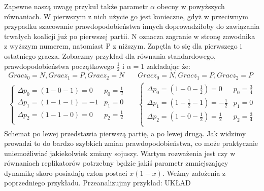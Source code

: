 Zapewne naszą uwagę przykuł także parametr $\alpha$ obecny w powyższych równaniach. W pierwszym z nich użycie go jest konieczne, gdyż w przeciwnym przypadku szacowanie prawdopodobieństwa innych doprowadziłoby do zawiązania trwałych koalicji już po pierwszej partii. N oznacza zagranie w stronę zawodnika z wyższym numerem, natomiast P z niższym. Zapętla to się dla pierwszego i ostatniego gracza. Zobaczmy przykład dla równania standardowego, prawdopodobieństwa początkowego $\frac{1}{2}$ i $\alpha = 1$ zakładając że:
\begin{align*}
Gracz_0 = N, Gracz_1 = P, Gracz_2 = N && Gracz_0 = N, Gracz_1 = P, Gracz_2 = P\\
\left\{
\begin{array}{ll}
\Delta p_0 = (1 - 0 - 1) =  0 & p_0=\frac{1}{2}\\
\Delta p_1 = (1 - 1 - 1) =  -1 & p_1= 0\\
\Delta p_2 = (1 - 1 - 0) =  0 & p_2=\frac{1}{2}\\
\end{array} 
\right. &&
\left\{
\begin{array}{ll}
\Delta p_0 = (1 - 0 - \frac{1}{2}) =  0 & p_0=\frac{3}{4}\\
\Delta p_1 = (1 - \frac{1}{2} - 1) =  -\frac{1}{2} & p_1= 0\\
\Delta p_2 = (1 - 0 - \frac{1}{2}) =  \frac{1}{2} & p_2=\frac{3}{4}\\
\end{array}
\right.
\end{align*}
Schemat po lewej przedstawia pierwszą partię, a po lewej drugą. Jak widzimy prowadzi to do bardzo szybkich zmian prawdopodobieństwa, co może praktycznie uniemożliwiać jakiekolwiek zmiany sojuszy. Wartym rozważenia jest czy w równaniach replikatorów potrzebny będzie jakiś parametr zmniejszający dynamikę skoro posiadają człon postaci $x(1-x)$. Weźmy założenia z poprzedniego przykładu. Przeanalizujmy przykład: {\color{red} UKŁAD}
